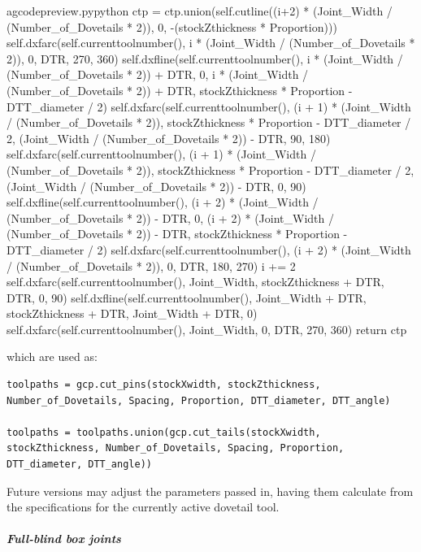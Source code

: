 \documentclass{ltxdoc}
\begin{document}
\begin{writecode}{a}{gcodepreview.py}{python}
            ctp = ctp.union(self.cutline((i+2) * (Joint_Width / (Number_of_Dovetails * 2)), 0, -(stockZthickness * Proportion)))
            self.dxfarc(self.currenttoolnumber(), i * (Joint_Width / (Number_of_Dovetails * 2)), 0, DTR, 270, 360)
            self.dxfline(self.currenttoolnumber(), 
                i * (Joint_Width / (Number_of_Dovetails * 2)) + DTR, 
                0, 
                i * (Joint_Width / (Number_of_Dovetails * 2)) + DTR, stockZthickness * Proportion - DTT_diameter / 2)
            self.dxfarc(self.currenttoolnumber(), (i + 1) * (Joint_Width / (Number_of_Dovetails * 2)), stockZthickness * Proportion - DTT_diameter / 2, (Joint_Width / (Number_of_Dovetails * 2)) - DTR, 90, 180)
            self.dxfarc(self.currenttoolnumber(), (i + 1) * (Joint_Width / (Number_of_Dovetails * 2)), stockZthickness * Proportion - DTT_diameter / 2, (Joint_Width / (Number_of_Dovetails * 2)) - DTR, 0, 90)
            self.dxfline(self.currenttoolnumber(), 
                (i + 2) * (Joint_Width / (Number_of_Dovetails * 2)) - DTR, 
                0, 
                (i + 2) * (Joint_Width / (Number_of_Dovetails * 2)) - DTR, stockZthickness * Proportion - DTT_diameter / 2)
            self.dxfarc(self.currenttoolnumber(), (i + 2) * (Joint_Width / (Number_of_Dovetails * 2)), 0, DTR, 180, 270)
            i += 2
        self.dxfarc(self.currenttoolnumber(), Joint_Width, stockZthickness + DTR, DTR, 0, 90)
        self.dxfline(self.currenttoolnumber(), Joint_Width + DTR, stockZthickness + DTR, Joint_Width + DTR, 0)
        self.dxfarc(self.currenttoolnumber(), Joint_Width, 0, DTR, 270, 360)
        return ctp

\end{writecode}
\addtocounter{gcpy}{63}

\noindent which are used as:

\begin{verbatim}
toolpaths = gcp.cut_pins(stockXwidth, stockZthickness, Number_of_Dovetails, Spacing, Proportion, DTT_diameter, DTT_angle)

toolpaths = toolpaths.union(gcp.cut_tails(stockXwidth, stockZthickness, Number_of_Dovetails, Spacing, Proportion, DTT_diameter, DTT_angle))
\end{verbatim}

Future versions may adjust the parameters passed in, having them calculate from the specifications for the currently active dovetail tool.

\subparagraph*{Full-blind box joints}
 
\label{subsec:fullblindboxjoints}
\end{document}
